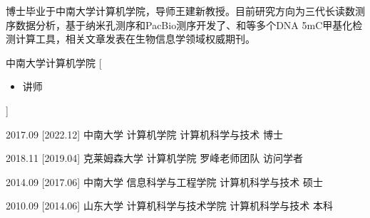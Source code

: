 \documentclass[zh]{resume}
\begin{document}
\makeheader

{\onehalfspacing\hspace{2em}%
博士毕业于中南大学计算机学院，导师王建新教授。目前研究方向为三代长读数测序数据分析，基于纳米孔测序和PacBio测序开发了、和等多个DNA 5mC甲基化检测计算工具，相关文章发表在生物信息学领域权威期刊。
\par}

\begin{competences}
\end{competences}

\begin{experiences}
    {中南大学计算机学院}%
    [\begin{itemize}
      \item 讲师
    \end{itemize}]

\end{experiences}

\begin{educations}
  \education%
    {2017.09}%
    [2022.12]%
    {中南大学}%
    {计算机学院}%
    {计算机科学与技术}%
    {博士}

  \separator{0.5ex}
  \education%
    {2018.11}%
    [2019.04]%
    {克莱姆森大学}%
    {计算机学院}%
    {罗峰老师团队}%
    {访问学者}

  \separator{0.5ex}
  \education%
    {2014.09}%
    [2017.06]%
    {中南大学}%
    {信息科学与工程学院}%
    {计算机科学与技术}%
    {硕士}

  \separator{0.5ex}
  \education%
    {2010.09}%
    [2014.06]%
    {山东大学}%
    {计算机科学与技术学院}%
    {计算机科学与技术}%
    {本科}
\end{educations}
\end{document}
